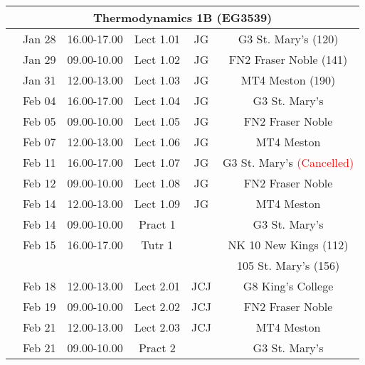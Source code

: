 \documentclass[11pt,oneside,a4paper]{article}
\begin{document}
\begin{center}
\begin{tabular}{||c||c|c|c|c|c||}
\hline\hline
\multicolumn{6}{||c||}{Thermodynamics 1B (EG3539)} \\
\hline\hline
\multirow{3}{*}{\color{red}{Week 30}} & Jan 28   & 16.00-17.00 & Lect  1.01  & JG  & G3 St. Mary's (120)\\
                                      & Jan 29   & 09.00-10.00 & Lect  1.02  & JG  & FN2 Fraser Noble (141)\\
                                      & Jan 31   & 12.00-13.00 & Lect  1.03  & JG  & MT4 Meston (190)   \\
\hline
\multirow{3}{*}{\color{red}{Week 31}} & Feb 04   & 16.00-17.00 & Lect  1.04  & JG  & G3 St. Mary's \\
                                      & Feb 05   & 09.00-10.00 & Lect  1.05  & JG  & FN2 Fraser Noble \\
                                      & Feb 07   & 12.00-13.00 & Lect  1.06  & JG  & MT4 Meston    \\
\hline
\multirow{3}{*}{\color{red}{Week 32}} & Feb 11   & 16.00-17.00 & Lect  1.07  & JG  & G3 St. Mary's \textcolor{red}{(Cancelled)}\\
                                      & Feb 12   & 09.00-10.00 & Lect  1.08  & JG  & FN2 Fraser Noble \\
                                      & Feb 14   & 12.00-13.00 & Lect  1.09  & JG  & MT4 Meston    \\
                                      & Feb 14   & 09.00-10.00 & Pract 1     &     & G3 St. Mary's \\
                                      & Feb 15   & 16.00-17.00 & Tutr  1     &     & NK 10 New Kings (112) \\
                                      &          &             &             &     & 105 St. Mary's (156) \\
\hline
\multirow{3}{*}{\color{red}{Week 33}} & Feb 18   & 12.00-13.00 & Lect  2.01  & JCJ & G8 King's College \\
                                      & Feb 19   & 09.00-10.00 & Lect  2.02  & JCJ & FN2 Fraser Noble \\
                                      & Feb 21   & 12.00-13.00 & Lect  2.03  & JCJ & MT4 Meston    \\
                                      & Feb 21   & 09.00-10.00 & Pract 2     &     & G3 St. Mary's \\

\end{tabular}
\end{center}
\end{document}
